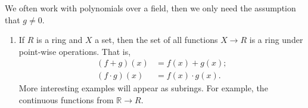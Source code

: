 \begin{remark}
    We often work with polynomials over a field, then we only need the assumption that \(g \neq 0\).
\end{remark}
\begin{example}
    \leavevmode
    \begin{enumerate}
        \item If \(R\) is a ring and \(X\) a set, then the set of all functions \(X \to R\) is a ring under point-wise operations. That is,
        \begin{align*}
            (f + g)(x) &= f(x) + g(x);\\
            (f \cdot g)(x) &= f(x) \cdot g(x).
        \end{align*}
        More interesting examples will appear as subrings. For example, the continuous functions from \(\mathbb{R}\to R\).
    \end{enumerate}
\end{example}